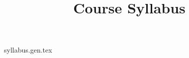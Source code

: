 \documentclass{scrartcl}
\title{Course Syllabus}
\date{\Term}
\begin{document}
\maketitle
\tableofcontents
\newpage

{syllabus.gen.tex}
\end{document}
